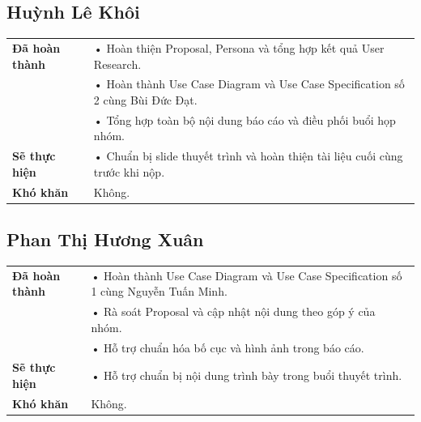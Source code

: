 \documentclass[11pt,a4paper]{article}
\begin{document}
\vspace{0.6cm}


\subsection*{Huỳnh Lê Khôi}

\begin{tabularx}{\textwidth}{|p{4cm}|X|}
\hline
\textbf{Đã hoàn thành} &
• Hoàn thiện Proposal, Persona và tổng hợp kết quả User Research.\\
&
• Hoàn thành Use Case Diagram và Use Case Specification số 2 cùng Bùi Đức Đạt.\\
&
• Tổng hợp toàn bộ nội dung báo cáo và điều phối buổi họp nhóm.\\
\hline

\textbf{Sẽ thực hiện} &
• Chuẩn bị slide thuyết trình và hoàn thiện tài liệu cuối cùng trước khi nộp.\\
\hline

\textbf{Khó khăn} &
Không.\\
\hline
\end{tabularx}

\vspace{0.6cm}


\subsection*{Phan Thị Hương Xuân}

\begin{tabularx}{\textwidth}{|p{4cm}|X|}
\hline
\textbf{Đã hoàn thành} &
• Hoàn thành Use Case Diagram và Use Case Specification số 1 cùng Nguyễn Tuấn Minh.\\
&
• Rà soát Proposal và cập nhật nội dung theo góp ý của nhóm.\\
&
• Hỗ trợ chuẩn hóa bố cục và hình ảnh trong báo cáo.\\
\hline

\textbf{Sẽ thực hiện} &
• Hỗ trợ chuẩn bị nội dung trình bày trong buổi thuyết trình.\\
\hline

\textbf{Khó khăn} &
Không.\\
\hline
\end{tabularx}

\vspace{0.6cm}
\end{document}
